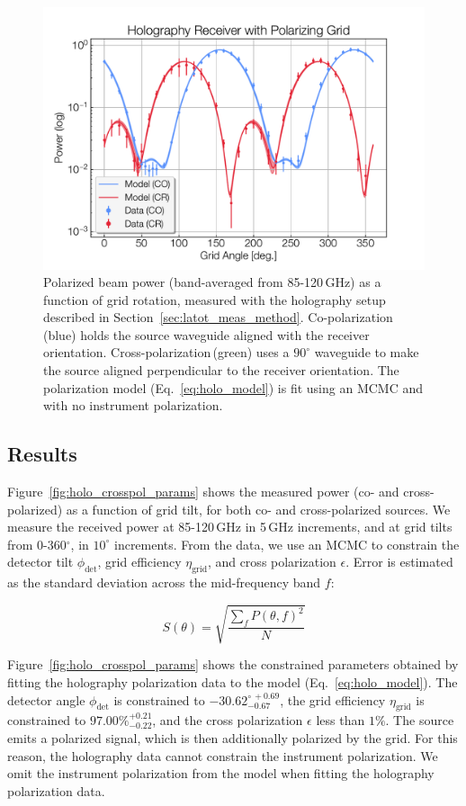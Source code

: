 \begin{figure}[ht!]
    \centering
    \includegraphics[height = .6\textwidth]{Figures/holo_pol_data.pdf}
    \caption{Polarized beam power (band-averaged from 85-120\,GHz) as a function of grid rotation, measured with the holography setup described in Section~\ref{sec:latot_meas_method}.  Co-polarization\,(blue) holds the source waveguide aligned with the receiver orientation.  Cross-polarization\,(green) uses a $90^{\circ}$ waveguide to make the source aligned perpendicular to the receiver orientation.  The polarization model (Eq.~\ref{eq:holo_model}) is fit using an MCMC and with no instrument polarization.}
    \label{fig:holo_crosspol_data}
\end{figure}

\subsection{Results}
Figure~\ref{fig:holo_crosspol_params} shows the measured power (co- and cross-polarized) as a function of grid tilt, for both co- and cross-polarized sources.  We measure the received power at 85-120\,GHz in 5\,GHz increments, and at grid tilts from 0-360$^{\circ}$, in $10^{\circ}$ increments.  From the data, we use an MCMC to constrain the detector tilt $\phi_{\text{det}}$, grid efficiency $\eta_{\text{grid}}$, and cross polarization $\epsilon$.  Error is estimated as the standard deviation across the mid-frequency band $f$:

\begin{equation}
    S(\theta) = \sqrt{\frac{\sum_f P(\theta,f)^2}{N}}
\end{equation}

Figure~\ref{fig:holo_crosspol_params} shows the constrained parameters obtained by fitting the holography polarization data to the model (Eq.~\ref{eq:holo_model}).  The detector angle $\phi_{\text{det}}$ is constrained to $-30.62^{\circ\,+0.69}_{-0.67}$, the grid efficiency $\eta_{\text{grid}}$ is constrained to $97.00\%^{+0.21}_{-0.22}$, and the cross polarization $\epsilon$ less than $1\%$.  The source emits a polarized signal, which is then additionally polarized by the grid.  For this reason, the holography data cannot constrain the instrument polarization.  We omit the instrument polarization from the model when fitting the holography polarization data. 

